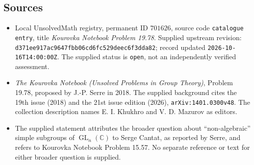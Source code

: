 \documentclass[11pt]{article}
\newcommand{\C}{\mathbb{C}}
\begin{document}
\subsection{Sources}
\begin{itemize}
\item Local UnsolvedMath registry, permanent ID \(701626\), source code \texttt{catalogue entry}, title \emph{Kourovka Notebook Problem 19.78}. Supplied upstream revision: \texttt{d371ee917ac9647fbb06cd6fc529deec6f3dda82}; record updated \texttt{2026-10-16T14:00:00Z}. The supplied status is \texttt{open}, not an independently verified assessment.
\item \emph{The Kourovka Notebook (Unsolved Problems in Group Theory)}, Problem 19.78, proposed by J.-P. Serre in 2018. The supplied background cites the 19th issue (2018) and the 21st issue edition (2026), \texttt{arXiv:1401.0300v48}. The collection description names E. I. Khukhro and V. D. Mazurov as editors.
\item The supplied statement attributes the broader question about ``non-algebraic'' simple subgroups of \(\operatorname{GL}_n(\C)\) to Serge Cantat, as reported by Serre, and refers to Kourovka Notebook Problem 15.57. No separate reference or text for either broader question is supplied.
\end{itemize}
\end{document}

